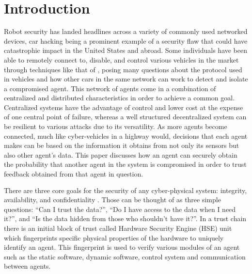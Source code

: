 \documentclass[conference]{IEEEtran}
\begin{document}


%
\IEEEpeerreviewmaketitle

\section{Introduction}
Robot security has landed headlines across a variety of commonly used networked devices, car hacking being a prominent example of a security flaw that could have catastrophic impact in the United States and abroad. Some individuals have been able to remotely connect to, disable, and control various vehicles in the market through techniques like that of \textcite{greenberg2015hackers}, posing many questions about the protocol used in vehicles and how other cars in the same network can work to detect and isolate a compromised agent. This network of agents come in a combination of centralized and distributed characteristics in order to achieve a common goal. Centralized systems have the advantage of control and lower cost at the expense of one central point of failure, whereas a well structured decentralized system can be resilient to various attacks due to its versatility. As more agents become connected, much like cyber-vehicles in a highway would, decisions that each agent makes can be based on the information it obtains from not only its sensors but also other agent's data. This paper discusses how an agent can securely obtain the probability that another agent in the system is compromised in order to trust feedback obtained from that agent in question.

There are three core goals for the security of any cyber-physical system: integrity, availability, and confidentiality \cite{Cardenas2008}. Those can be thought of as three simple questions: ``Can I trust the data?'', ``Do I have access to the data when I need it?'', and ``Is the data hidden from those who shouldn't have it?''. In a trust chain there is an initial block of trust called Hardware Security Engine (HSE) unit which fingerprints specific physical properties of the hardware to uniquely identify an agent. This fingerprint is used to verify various modules of an agent such as the static software, dynamic software, control system and communication between agents.
\end{document}
